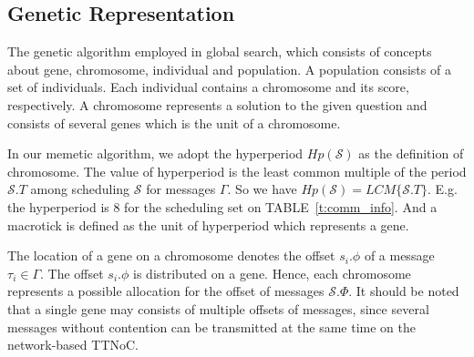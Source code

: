 \documentclass[journal]{IEEEtran}
\newcommand{\calS}{\mathcal{S}}
\theoremstyle{remark}
\begin{document}
\subsection{Genetic Representation}

The genetic algorithm employed in global search, which consists of concepts about gene, chromosome,
 individual and population. 
A population consists of a set of individuals. 
Each individual contains a chromosome and its score, respectively.
A chromosome represents a solution to the given question and consists of several genes which is the unit of a chromosome.

In our memetic algorithm,
 we adopt the hyperperiod $Hp(\calS)$ as the definition of chromosome.
The value of hyperperiod is the least common multiple of the period $\calS.T$ among scheduling $\calS$ for messages $\Gamma$.
So we have $Hp(\calS) = LCM\{\calS.T\}$.
E.g. the hyperperiod is 8 for the scheduling set on TABLE~\ref{t:comm_info}. 
And a macrotick is defined as the unit of hyperperiod which represents a gene.


The location of a gene on a chromosome denotes the offset $ s_i.\phi $ of a message $\tau_i\in\Gamma$.
The offset $s_i.\phi$ is distributed on a gene.
Hence, each chromosome represents a possible allocation for the offset of messages $\calS.\Phi$.
It should be noted that a single gene may consists of multiple offsets of messages,
 since several messages without contention can be transmitted at the same time on the network-based TTNoC.
\end{document}
